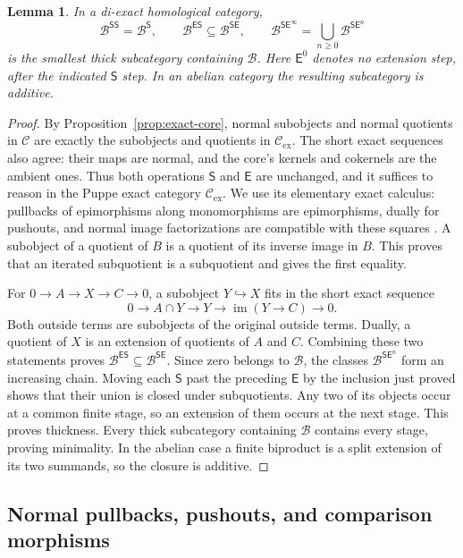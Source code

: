 \documentclass[11pt,reqno,a4paper]{amsart}
\newtheorem{lemma}[theorem]{Lemma}
\theoremstyle{definition}
\theoremstyle{remark}
\newcommand{\C}{\mathcal{C}}
\newcommand{\0}{\mathbf{0}}
\renewcommand{\1}{\mathbf{1}}
\begin{document}
\begin{lemma}\label{LemD}
In a di-exact homological category,
\[
 \mathcal B^{\mathsf{SS}}=\mathcal B^{\mathsf S},\qquad
 \mathcal B^{\mathsf{ES}}\subseteq\mathcal B^{\mathsf{SE}},\qquad
 \mathcal B^{\mathsf{SE}^{\infty}}
   =\bigcup_{n\ge0}\mathcal B^{\mathsf{SE}^{n}}
\]
is the smallest thick subcategory containing $\mathcal B$.
Here $\mathsf E^0$ denotes no extension step, after the indicated
$\mathsf S$ step. In an abelian category the resulting subcategory
is additive.
\end{lemma}
\begin{proof}
By Proposition~\ref{prop:exact-core}, normal subobjects and
normal quotients in $\C$ are exactly the subobjects and quotients
in $\C_{\mathrm{ex}}$. The short exact sequences also agree:
their maps are normal, and the core's kernels and cokernels are
the ambient ones. Thus both operations $\mathsf S$ and
$\mathsf E$ are unchanged, and it suffices to reason in the
Puppe exact category $\C_{\mathrm{ex}}$. We use its elementary exact calculus: pullbacks of
epimorphisms along monomorphisms are epimorphisms, dually for pushouts,
and normal image factorizations are compatible with these squares
\cite{BP69,Mit65}. A subobject of a quotient of $B$ is a quotient of
its inverse image in $B$. This proves that an iterated subquotient
is a subquotient and gives the first equality.

For $0\to A\to X\to C\to0$, a subobject $Y\hookrightarrow X$
fits in the short exact sequence
\[
 0\longrightarrow A\cap Y\longrightarrow Y
 \longrightarrow\operatorname{im}(Y\to C)\longrightarrow0.
\]
Both outside terms are subobjects of the original outside terms.
Dually, a quotient of $X$ is an extension of quotients of $A$ and
$C$. Combining these two statements proves
$\mathcal B^{\mathsf{ES}}\subseteq\mathcal B^{\mathsf{SE}}$.
Since zero belongs to $\mathcal B$, the classes
$\mathcal B^{\mathsf{SE}^n}$ form an increasing chain.
Moving each $\mathsf S$ past the preceding $\mathsf E$ by the
inclusion just proved shows that their union is closed under
subquotients. Any two of its objects occur at a common finite stage,
so an extension of them occurs at the next stage. This proves
thickness. Every thick subcategory containing $\mathcal B$ contains
every stage, proving minimality. In the abelian case a finite
biproduct is a split extension of its two summands, so the closure
is additive.
\end{proof}

\subsection{Normal pullbacks, pushouts, and comparison morphisms}\label{di:sec:grandis}
\end{document}
